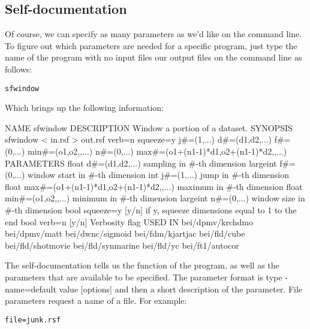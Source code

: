 \subsection{Self-documentation}
Of course, we can specify as many parameters as we'd like on the command line. To figure out which parameters are needed for a specific program, just type the name of the program with no input files our output files on the command line as follows:
\begin{verbatim}
sfwindow
\end{verbatim}
Which brings up the following information:
\begin{verbatimtab}[4]
NAME
        sfwindow
DESCRIPTION
        Window a portion of a dataset. 
SYNOPSIS
        sfwindow < in.rsf > out.rsf verb=n squeeze=y j#=(1,...) 
        d#=(d1,d2,...) f#=(0,...) min#=(o1,o2,,...) n#=(0,...) 
        max#=(o1+(n1-1)*d1,o2+(n1-1)*d2,,...)
PARAMETERS
        float   d#=(d1,d2,...)  sampling in #-th dimension 
        largeint f#=(0,...)     window start in #-th dimension 
        int     j#=(1,...)      jump in #-th dimension 
        float   max#=(o1+(n1-1)*d1,o2+(n1-1)*d2,,...)   
            maximum in #-th dimension 
        float   min#=(o1,o2,,...)       minimum in #-th dimension 
        largeint n#=(0,...)     window size in #-th dimension 
        bool    squeeze=y [y/n] 
            if y, squeeze dimensions equal to 1 to the end 
        bool    verb=n [y/n]    Verbosity flag
USED IN
        bei/dpmv/krchdmo
        bei/dpmv/matt
        bei/dwnc/sigmoid
        bei/fdm/kjartjac
        bei/fld/cube
        bei/fld/shotmovie
        bei/fld/synmarine
        bei/fld/yc
        bei/ft1/autocor
\end{verbatimtab}

The self-documentation tells us the function of the program, as well as the parameters that are available to be specified. The parameter format is type - name=default value [options] and then a short description of the parameter. File parameters request a name of a file. For example: 
\begin{verbatim} 
file=junk.rsf 
\end{verbatim}


